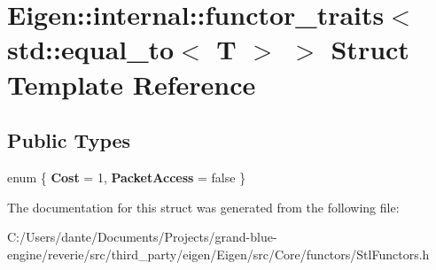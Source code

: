 \hypertarget{struct_eigen_1_1internal_1_1functor__traits_3_01std_1_1equal__to_3_01_t_01_4_01_4}{}\section{Eigen\+::internal\+::functor\+\_\+traits$<$ std\+::equal\+\_\+to$<$ T $>$ $>$ Struct Template Reference}
\label{struct_eigen_1_1internal_1_1functor__traits_3_01std_1_1equal__to_3_01_t_01_4_01_4}
\subsection*{Public Types}
\begin{DoxyCompactItemize}
\item 
\mbox{\label{struct_eigen_1_1internal_1_1functor__traits_3_01std_1_1equal__to_3_01_t_01_4_01_4_a6b350361ac326ad314f40d2a8acbfa58}} 
enum \{ {\bfseries Cost} = 1, 
{\bfseries Packet\+Access} = false
 \}
\end{DoxyCompactItemize}


The documentation for this struct was generated from the following file\+:\begin{DoxyCompactItemize}
\item 
C\+:/\+Users/dante/\+Documents/\+Projects/grand-\/blue-\/engine/reverie/src/third\+\_\+party/eigen/\+Eigen/src/\+Core/functors/Stl\+Functors.\+h\end{DoxyCompactItemize}
